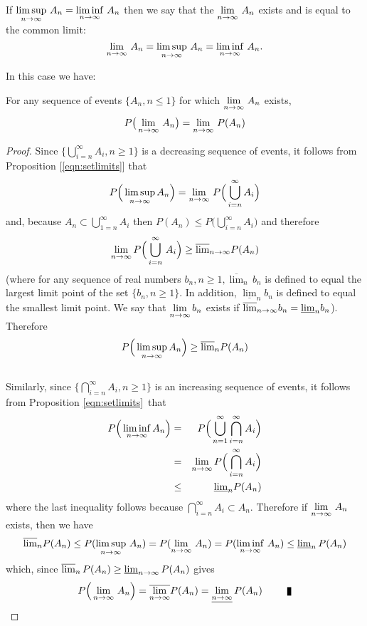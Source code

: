 \begin{definition}
If $\displaystyle{\limsup_{n\rightarrow\infty} \, A_n  = \liminf_{n\rightarrow\infty}\, A_n}$ then we say that the $\displaystyle{\lim_{n\rightarrow\infty}\, A_n}$ exists and is equal to the common limit:
$$ \lim_{n\rightarrow\infty}\, A_n = \limsup_{n\rightarrow\infty} \, A_n  = \liminf_{n\rightarrow\infty}\, A_n.$$ 
\end{definition}

In this case we have: 
\begin{theorem} For any sequence of events $\{ A_n, n\le 1\}$ for which $\displaystyle{\lim_{n\rightarrow\infty}\, A_n}$ exists, 
$$P\big(\lim_{n\rightarrow\infty}\, A_n \big) = \lim_{n\rightarrow\infty}\, P(A_n)$$
\end{theorem}

\begin{proof}
Since $\Big\{\bigcup\limits_{i=n}^\infty A_i, n\ge1\Big\}$ is a decreasing sequence of events, it follows from Proposition [\ref{eqn:setlimits}]  that
$$P\Big( \limsup_{n\rightarrow\infty} A_n  \Big)  = \lim_{n\rightarrow\infty}\, P\Big( \bigcup\limits_{i=n}^\infty A_i \Big)$$  and, because $A_n \subset \bigcup\limits_{1=n}^\infty A_i$ then $P(A_n) \le P\big( \bigcup\limits_{i=n}^\infty A_i \big)$ and therefore
$$\lim_{n\rightarrow\infty} P\Big( \bigcup\limits_{i=n}^\infty\, A_i \Big) \ge \overline{\lim}_{n\rightarrow\infty} P(A_n)$$ (where for any sequence of real numbers $\displaystyle{b_n, n\ge 1, \overline{\lim}_n\, b_n}$ is defined to equal the largest limit point of the set $\{b_n, n\ge1  \}$. In addition, $\displaystyle{\underline{\lim}_n  b_n}$ is defined to equal the smallest limit point. We say that $\displaystyle{\lim_{n\rightarrow\infty} b_n}$ exists if $\displaystyle{\overline{\lim}_{n\rightarrow\infty} b_n = \underline{\lim}_n b_n}$). Therefore $$\displaystyle{P\Big(\limsup_{n\rightarrow\infty} A_n   \Big) \ge \overline{\lim}_n P(A_n)}$$\\

Similarly, since $\Big\{\bigcap\limits_{i=n}^\infty A_i, n\ge1\Big\}$ is an increasing sequence of events, it follows from Proposition \ref{eqn:setlimits}\ that 
\begin{eqnarray*}
 P\Big( \liminf_{n\rightarrow\infty} A_n  \Big)  &=& P\Big(\bigcup\limits_{n=1}^\infty \bigcap\limits_{i=n}^\infty A_i \Big)\\
 &=& \lim_{n\rightarrow\infty} P\Big(\bigcap\limits_{i=n}^\infty A_i   \Big)\\
 &\le& \underline{\lim}_n P(A_n)
\end{eqnarray*}
where the last inequality follows because $\bigcap\limits_{i=n}^\infty A_i \subset A_n$. Therefore if $\displaystyle{\lim_{n\rightarrow\infty}\, A_n}$ exists, then we have
$$\displaystyle{\overline{\lim}_n P(A_n) \le P(\limsup_{n\rightarrow\infty}\, A_n) = P(\lim_{n\rightarrow\infty}\, A_n) = P(\liminf_{n\rightarrow\infty}\, A_n) \le \underline{\lim}_n\, P(A_n)}$$
which, since $\displaystyle{\overline{\lim}_n\, P(A_n) \ge \underline{\lim}_{n\rightarrow\infty}\, P(A_n)}$ gives
$$P\Big(\lim_{\ninfty}\, A_n  \Big) = \overline{\lim_{\ninfty}} P(A_n) = \underline{\lim_{\ninfty}}\, P(A_n)\quad\qed$$
\end{proof}

